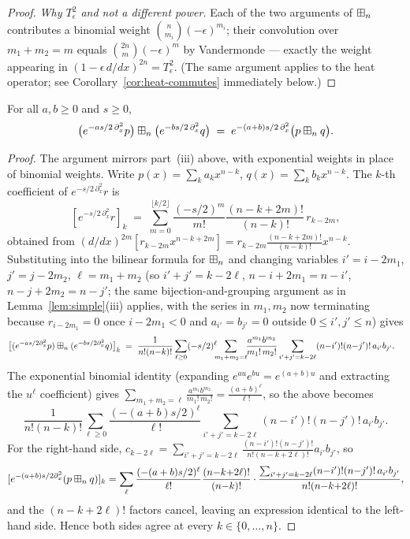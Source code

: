 \begin{proof}
\smallskip\noindent\textit{Why $T_\epsilon^2$ and not a different power.}
Each of the two arguments of $\boxplus_n$ contributes a binomial weight
$\binom{n}{m_i}(-\epsilon)^{m_i}$; their convolution over $m_1+m_2=m$
equals $\binom{2n}{m}(-\epsilon)^m$ by Vandermonde — exactly the weight
appearing in $(1-\epsilon\,d/dx)^{2n}=T_\epsilon^2$.
(The same argument applies to the heat operator; see
Corollary~\ref{cor:heat-commutes} immediately below.)
\end{proof}

\begin{qfourcorollary}\label{cor:heat-commutes}
For all $a,b\ge0$ and $s\ge0$,
\[
\bigl(e^{-as/2\,\partial_x^2}p\bigr)\boxplus_n\bigl(e^{-bs/2\,\partial_x^2}q\bigr)
\;=\;e^{-(a+b)s/2\,\partial_x^2}\bigl(p\boxplus_n q\bigr).
\]
\end{qfourcorollary}

\begin{proof}
The argument mirrors part~(iii) above, with exponential weights in place of
binomial weights.  Write $p(x)=\sum_k a_kx^{n-k}$, $q(x)=\sum_k b_kx^{n-k}$.
The $k$-th coefficient of $e^{-s/2\,\partial_x^2}r$ is
\[
[e^{-s/2\,\partial_x^2}r]_k
\;=\;\sum_{m=0}^{\lfloor k/2\rfloor}\frac{(-s/2)^m}{m!}
 \frac{(n{-}k{+}2m)!}{(n{-}k)!}\,r_{k-2m},
\]
obtained from $(d/dx)^{2m}[r_{k-2m}x^{n-k+2m}]
=r_{k-2m}\frac{(n-k+2m)!}{(n-k)!}x^{n-k}$.
Substituting into the bilinear formula for $\boxplus_n$ and
changing variables $i'=i-2m_1$, $j'=j-2m_2$, $\ell=m_1+m_2$
(so $i'+j'=k-2\ell$, $n-i+2m_1=n-i'$, $n-j+2m_2=n-j'$; the same
bijection-and-grouping argument as in Lemma~\ref{lem:simple}(iii) applies, with
the series in $m_1,m_2$ now terminating because $r_{i-2m_1}=0$ once
$i-2m_1<0$ and $a_{i'}=b_{j'}=0$ outside $0\le i',j'\le n$) gives
\begin{align*}
\bigl[(e^{-as/2\partial_x^2}p)\boxplus_n(e^{-bs/2\partial_x^2}q)\bigr]_k
&\;=\;\frac{1}{n!(n{-}k)!}\sum_{\ell\ge0}(-s/2)^\ell
 \!\!\!\sum_{m_1+m_2=\ell}\!\!\frac{a^{m_1}b^{m_2}}{m_1!\,m_2!}
 \sum_{i'+j'=k-2\ell}(n{-}i')!(n{-}j')!\,a_{i'}b_{j'}.
\end{align*}
The exponential binomial identity (expanding $e^{au}e^{bu}=e^{(a+b)u}$
and extracting the $u^\ell$ coefficient) gives
$\sum_{m_1+m_2=\ell}\frac{a^{m_1}b^{m_2}}{m_1!\,m_2!}=\frac{(a+b)^\ell}{\ell!}$,
so the above becomes
\[
\frac{1}{n!(n{-}k)!}\sum_{\ell\ge0}\frac{(-(a+b)s/2)^\ell}{\ell!}
\sum_{i'+j'=k-2\ell}(n{-}i')!(n{-}j')!\,a_{i'}b_{j'}.
\]
For the right-hand side, $c_{k-2\ell}=\sum_{i'+j'=k-2\ell}
\frac{(n-i')!(n-j')!}{n!(n-k+2\ell)!}a_{i'}b_{j'}$, so
\[
[e^{-(a+b)s/2\partial_x^2}(p\boxplus_n q)]_k
=\sum_\ell\frac{(-(a+b)s/2)^\ell}{\ell!}\frac{(n{-}k{+}2\ell)!}{(n{-}k)!}
\cdot\frac{\sum_{i'+j'=k-2\ell}(n{-}i')!(n{-}j')!\,a_{i'}b_{j'}}{n!(n{-}k{+}2\ell)!},
\]
and the $(n{-}k{+}2\ell)!$ factors cancel, leaving an expression identical
to the left-hand side.  Hence both sides agree at every
$k\in\{0,\dots,n\}$.
\end{proof}

